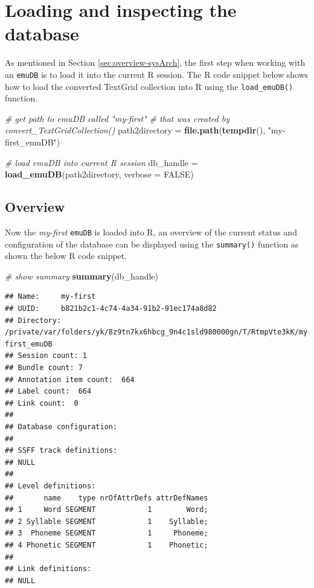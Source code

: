 \documentclass[]{book}
\newenvironment{Shaded}{\begin{snugshade}}{\end{snugshade}}
\newcommand{\CommentTok}[1]{\textcolor[rgb]{0.56,0.35,0.01}{\textit{#1}}}
\newcommand{\DataTypeTok}[1]{\textcolor[rgb]{0.13,0.29,0.53}{#1}}
\newcommand{\KeywordTok}[1]{\textcolor[rgb]{0.13,0.29,0.53}{\textbf{#1}}}
\newcommand{\NormalTok}[1]{#1}
\newcommand{\OtherTok}[1]{\textcolor[rgb]{0.56,0.35,0.01}{#1}}
\newcommand{\StringTok}[1]{\textcolor[rgb]{0.31,0.60,0.02}{#1}}
\begin{document}
\hypertarget{loading-and-inspecting-the-database}{%
\section{Loading and inspecting the database}\label{loading-and-inspecting-the-database}}

As mentioned in Section \ref{sec:overview-sysArch}, the first step when working with an \texttt{emuDB} is to load it into the current R session. The R code snippet below shows how to load the converted TextGrid collection into R using the \texttt{load\_emuDB()} function.

\begin{Shaded}
\begin{Highlighting}[]
\CommentTok{# get path to emuDB called "my-first"}
\CommentTok{# that was created by convert_TextGridCollection()}
\NormalTok{path2directory =}\StringTok{ }\KeywordTok{file.path}\NormalTok{(}\KeywordTok{tempdir}\NormalTok{(), }\StringTok{"my-first_emuDB"}\NormalTok{)}

\CommentTok{# load emuDB into current R session}
\NormalTok{db_handle =}\StringTok{ }\KeywordTok{load_emuDB}\NormalTok{(path2directory, }\DataTypeTok{verbose =} \OtherTok{FALSE}\NormalTok{)}
\end{Highlighting}
\end{Shaded}

\hypertarget{overview}{%
\subsection{Overview}\label{overview}}

Now the \emph{my-first} \texttt{emuDB} is loaded into R, an overview of the current status and configuration of the database can be displayed using the \texttt{summary()} function as shown the below R code snippet.

\begin{Shaded}
\begin{Highlighting}[]
\CommentTok{# show summary}
\KeywordTok{summary}\NormalTok{(db_handle)}
\end{Highlighting}
\end{Shaded}

\begin{verbatim}
## Name:     my-first 
## UUID:     b821b2c1-4c74-4a34-91b2-91ec174a8d82 
## Directory:    /private/var/folders/yk/8z9tn7kx6hbcg_9n4c1sld980000gn/T/RtmpVte3kK/my-first_emuDB 
## Session count: 1 
## Bundle count: 7 
## Annotation item count:  664 
## Label count:  664 
## Link count:  0 
## 
## Database configuration:
## 
## SSFF track definitions:
## NULL
## 
## Level definitions:
##       name    type nrOfAttrDefs attrDefNames
## 1     Word SEGMENT            1        Word;
## 2 Syllable SEGMENT            1    Syllable;
## 3  Phoneme SEGMENT            1     Phoneme;
## 4 Phonetic SEGMENT            1    Phonetic;
## 
## Link definitions:
## NULL
\end{verbatim}
\end{document}
